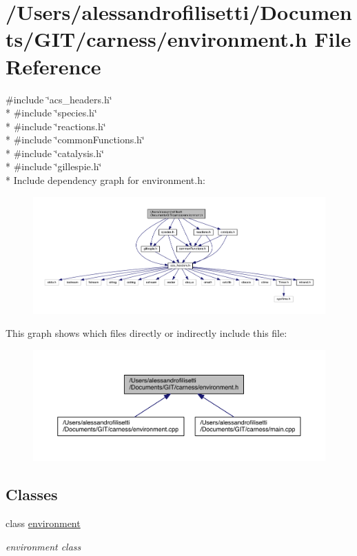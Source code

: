 \hypertarget{a00063}{\section{/\+Users/alessandrofilisetti/\+Documents/\+G\+I\+T/carness/environment.h File Reference}
\label{a00063}
}
{\ttfamily \#include \char`\"{}acs\+\_\+headers.\+h\char`\"{}}\\*
{\ttfamily \#include \char`\"{}species.\+h\char`\"{}}\\*
{\ttfamily \#include \char`\"{}reactions.\+h\char`\"{}}\\*
{\ttfamily \#include \char`\"{}common\+Functions.\+h\char`\"{}}\\*
{\ttfamily \#include \char`\"{}catalysis.\+h\char`\"{}}\\*
{\ttfamily \#include \char`\"{}gillespie.\+h\char`\"{}}\\*
Include dependency graph for environment.\+h\+:\nopagebreak
\begin{figure}[H]
\begin{center}
\leavevmode
\includegraphics[width=350pt]{a00182}
\end{center}
\end{figure}
This graph shows which files directly or indirectly include this file\+:\nopagebreak
\begin{figure}[H]
\begin{center}
\leavevmode
\includegraphics[width=350pt]{a00183}
\end{center}
\end{figure}
\subsection*{Classes}
\begin{DoxyCompactItemize}
\item 
class \hyperlink{a00013}{environment}
\begin{DoxyCompactList}\small\item\em environment class \end{DoxyCompactList}\end{DoxyCompactItemize}
